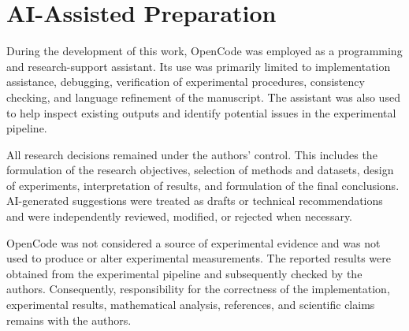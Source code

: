\section{AI-Assisted Preparation}
\label{app:ai}

During the development of this work, OpenCode was employed as a programming and
research-support assistant. Its use was primarily limited to implementation assistance,
debugging, verification of experimental procedures, consistency checking, and language
refinement of the manuscript. The assistant was also used to help inspect existing
outputs and identify potential issues in the experimental pipeline.

All research decisions remained under the authors' control. This includes the
formulation of the research objectives, selection of methods and datasets, design of
experiments, interpretation of results, and formulation of the final conclusions.
AI-generated suggestions were treated as drafts or technical recommendations and were
independently reviewed, modified, or rejected when necessary.

OpenCode was not considered a source of experimental evidence and was not used to
produce or alter experimental measurements. The reported results were obtained from the
experimental pipeline and subsequently checked by the authors. Consequently,
responsibility for the correctness of the implementation, experimental results,
mathematical analysis, references, and scientific claims remains with the authors.
